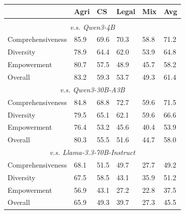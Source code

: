 \documentclass[11pt]{article}
\begin{document}
\begin{table}[t!]
\centering
\small
\begin{tabularx}{0.48\textwidth}{lXXXXX}
\toprule
& Agri & CS & Legal & Mix & Avg \\ \midrule
\rowcolor{gray!20} 
\multicolumn{6}{c}{\textbf{Zero-shot LLM Generation}}\\ \midrule
\multicolumn{6}{c}{\textit{v.s. Qwen3-4B}}\\ \midrule
Comprehensiveness & 85.9 & 69.6 & 70.3 & 58.8 & 71.2 \\
Diversity         & 78.9 & 64.4 & 62.0 & 53.9 & 64.8 \\
Empowerment       & 80.7 & 57.5 & 48.9 & 45.7 & 58.2 \\
Overall           & 83.2 & 59.3 & 53.7 & 49.3 & 61.4 \\ \midrule

\multicolumn{6}{c}{\textit{v.s. Qwen3-30B-A3B}}\\ \midrule
Comprehensiveness & 84.8 & 68.8 & 72.7 & 59.6 & 71.5 \\
Diversity         & 79.5 & 65.1 & 62.1 & 59.6 & 66.6 \\
Empowerment       & 76.4 & 53.2 & 45.6 & 40.4 & 53.9 \\
Overall           & 80.3 & 55.5 & 51.6 & 44.7 & 58.0 \\ \midrule

\multicolumn{6}{c}{\textit{v.s. Llama-3.3-70B-Instruct}}\\ \midrule
Comprehensiveness & 68.1 & 51.5 & 49.7 & 27.7 & 49.2 \\
Diversity         & 67.5 & 58.5 & 43.1 & 35.9 & 51.2 \\
Empowerment       & 56.9 & 43.1 & 27.2 & 22.8 & 37.5 \\
Overall           & 65.9 & 49.3 & 39.7 & 27.3 & 45.5 \\ \midrule


\end{tabularx}
\end{table}
\end{document}
